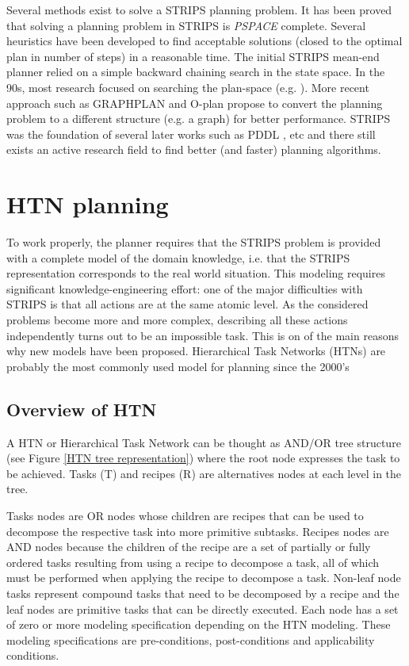 \par Several methods exist to solve a STRIPS planning problem. It has been proved \cite{bylander1994computational} that solving a planning problem in STRIPS is \emph{PSPACE} complete. Several heuristics have been developed to find acceptable solutions (closed to the optimal plan in number of steps) in a reasonable time. The initial STRIPS mean-end planner relied on a simple backward chaining search in the
state space. In the 90s, most research focused on searching the plan-space (e.g. \cite{russell2009artificial}). More recent approach such as GRAPHPLAN \cite{blum1997fast} and O-plan \cite{currie1991plan} propose to convert the planning problem to a different structure (e.g. a graph) for better performance.
STRIPS was the foundation of several later works such as PDDL \cite{mcdermott1998pddl}, etc and there still exists an active research field to find better (and faster) planning algorithms.

\section{HTN planning}
 To work properly, the planner requires that the STRIPS problem is provided with a complete model of the domain knowledge, i.e. that the STRIPS representation corresponds to the real world situation. This modeling requires significant knowledge-engineering effort: one of the major difficulties with STRIPS is that all actions are at the same atomic level. As the considered problems become more and more complex, describing all these actions independently turns out to be an impossible task. This is on of the main reasons why new models have been proposed. Hierarchical Task Networks (HTNs) are probably the most commonly used model for planning since the 2000's
\subsection{Overview of HTN}
\par A HTN or Hierarchical Task Network can be thought as AND/OR tree structure (see Figure \ref{HTN tree representation}) where the root node expresses the task to be achieved. Tasks (T) and recipes (R) are alternatives nodes at each level in the tree.

\par Tasks nodes are OR nodes whose children are recipes that can be used to decompose the respective task into more primitive subtasks. Recipes nodes are AND nodes because the children of the recipe are a set of partially or fully ordered tasks resulting from using a recipe to decompose a task, all of which must be performed
when applying the recipe to decompose a task. Non-leaf node tasks represent compound tasks that need to be decomposed by a recipe and the leaf nodes are primitive tasks that can be directly executed. Each node has a set of zero or more modeling specification depending on the HTN modeling. These modeling specifications are pre-conditions, post-conditions and applicability conditions.

